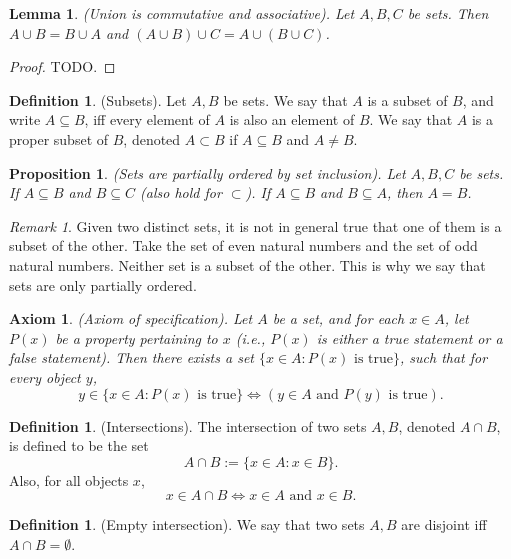 \documentclass[12pt]{article}
\newtheorem{lemma}[theorem]{Lemma}
\newtheorem{proposition}[theorem]{Proposition}
\newtheorem{axiom}[theorem]{Axiom}
\theoremstyle{definition}
\newtheorem{definition}[theorem]{Definition}
\theoremstyle{remark}
\newtheorem*{remark}{Remark}
\begin{document}
\begin{lemma}
    (Union is commutative and associative). Let $A, B, C$ be sets. Then $A \cup B = B \cup A$ and $(A \cup B) \cup C = A \cup (B \cup C)$.
\end{lemma}

\begin{proof}
    TODO.
\end{proof}

\begin{definition}
    (Subsets). Let $A, B$ be sets. We say that $A$ is a subset of $B$, and write $A \subseteq B$, iff every element of $A$ is also an element of $B$. We say that $A$ is a proper subset of $B$, denoted $A \subset B$ if $A \subseteq B$ and $A \neq B$. 
\end{definition}

\begin{proposition}
    (Sets are partially ordered by set inclusion). Let $A, B, C$ be sets. If $A \subseteq B$ and $B \subseteq C$ (also hold for $\subset$). If $A \subseteq B$ and $B \subseteq A$, then $A=B$.
\end{proposition}

\begin{remark}
    Given two distinct sets, it is not in general true that one of them is a subset of the other. Take the set of even natural numbers and the set of odd natural numbers. Neither set is a subset of the other. This is why we say that sets are only partially ordered.
\end{remark}

\begin{axiom}
    (Axiom of specification). Let $A$ be a set, and for each $x \in A$, let $P(x)$ be a property pertaining to $x$ (i.e., $P(x)$ is either a true statement or a false statement). Then there exists a set $\{x \in A \colon P(x) \text{ is true}\}$, such that for every object $y$, \[
        y \in \{x \in A \colon P(x) \text{ is true}\} \iff (y \in A \text{ and } P(y) \text{ is true})
    .\]
\end{axiom}

\begin{definition}
    (Intersections). The intersection of two sets $A, B$, denoted $A \cap B$, is defined to be the set \[
        A \cap B := \{x \in A \colon x \in B\}
    .\]
    Also, for all objects $x$, \[
        x \in A \cap B \iff x \in A \text{ and } x \in B 
    .\]
\end{definition}

\begin{definition}
    (Empty intersection). We say that two sets $A, B$ are disjoint iff $A \cap B = \emptyset$.
\end{definition}
    
\end{document}
